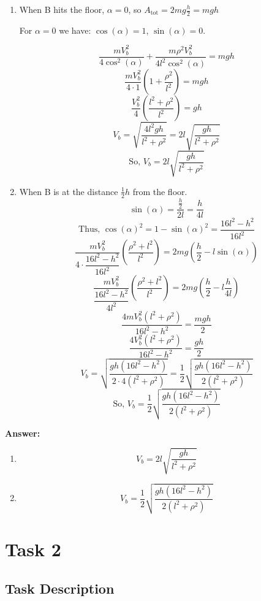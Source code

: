 \documentclass{article}
\begin{document}
\begin{enumerate}
  \item When B hits the floor, $\alpha = 0$, so $A_\text{tot} = 2 m g \frac{h}{2} = mgh$
    \begin{center}
      For $\alpha = 0$ we have: $\cos(\alpha) = 1$, $\sin(\alpha) = 0$.
    \end{center}
    \[ \frac{m V_b^2}{4 \cos^2(\alpha)} + \frac{m \rho^2 V_b^2}{4l^2 \cos^2(\alpha)} = mgh\]
    \[ \frac{m V_b^2}{4 \cdot 1} (1 + \frac{\rho^2}{l^2}) = mgh\]
    \[ \frac{V_b^2}{4} (\frac{l^2 + \rho^2}{l^2}) = gh\]
    \[ V_b = \sqrt{\dfrac{4l^2gh}{l^2 + \rho^2}} = 2l \sqrt{\dfrac{gh}{l^2 + \rho^2}}\]
    \[ \text{So, } V_b = 2l \sqrt{\dfrac{gh}{l^2 + \rho^2}}\]


  \item When B  is at the distance $ \frac{1}{2} h$ from the floor. 
    \[\sin(\alpha) = \dfrac{\frac{h}{2}}{2l} = \dfrac{h}{4l}\]
    \[\text{Thus, } \cos(\alpha)^2 = 1 - \sin(\alpha)^2 = \dfrac{16l^2 - h^2}{16l^2}\]
    \[ \frac{m V_b^2}{4 \cdot \dfrac{16l^2 - h^2}{16l^2}} (\dfrac{\rho^2 + l^2}{l^2}) = 2mg(\frac{h}{2} - l \sin(\alpha))\]
    \[ \frac{m V_b^2}{\dfrac{16l^2 - h^2}{4l^2}} (\dfrac{\rho^2 + l^2}{l^2}) = 2mg(\frac{h}{2} - l \frac{h}{4l})\]
    \[ \frac{4 mV_b^2 (l^2+\rho^2)}{16l^2 - h^2} = \dfrac{mgh}{2}\]
    \[ \frac{4 V_b^2 (l^2+\rho^2)}{16l^2 - h^2} = \dfrac{gh}{2}\]
    \[ V_b = \sqrt{\dfrac{gh(16l^2-h^2)}{2 \cdot 4(l^2 + \rho^2)}} = \dfrac{1}{2} \sqrt{\dfrac{gh(16l^2 - h^2)}{2(l^2 + \rho^2)}}\]
    \[ \text{So, } V_b = \dfrac{1}{2} \sqrt{\dfrac{gh(16l^2 - h^2)}{2(l^2 + \rho^2)}}\]
\end{enumerate}

\textbf{Answer:}
\begin{enumerate}
  \item \[V_b = 2l \sqrt{\dfrac{gh}{l^2 + \rho^2}}\]
  \item \[V_b = \dfrac{1}{2} \sqrt{\dfrac{gh(16l^2 - h^2)}{2(l^2 + \rho^2)}}\]
\end{enumerate}

\section{Task 2}

\subsection{Task Description}
\end{document}
